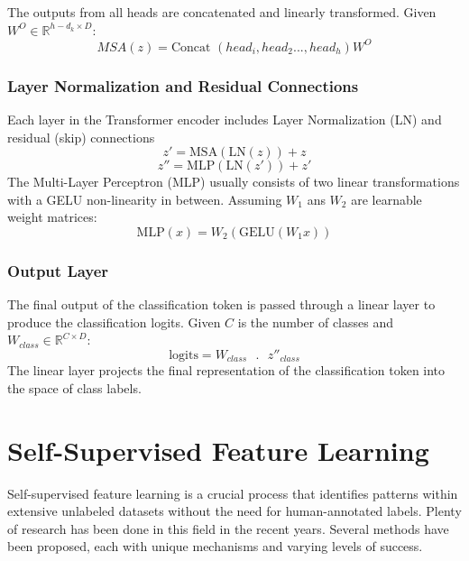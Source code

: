 The outputs from all heads are concatenated and linearly transformed. Given \(W^O \in \mathbb{R}^{h-d_k \times D } \):
\begin{equation}
	MSA(z) = \text{Concat  }(head_i, head_2..., head_h)W^O
\end{equation}

\subsubsection{Layer Normalization and Residual Connections}
Each layer in the Transformer encoder includes Layer Normalization (LN) and residual (skip) connections
\begin{equation}
	z' = \text{MSA}(\text{LN}(z)) + z
\end{equation}
\begin{equation}
	z'' = \text{MLP}(\text{LN}(z')) + z'
\end{equation}
The Multi-Layer Perceptron (MLP) usually consists of two linear transformations with a GELU non-linearity in between. Assuming \(W_1\) ans \(W_2\) are learnable weight matrices:
\begin{equation}
	\text{MLP}(x) = W_2(\text{GELU}(W_1x))
\end{equation}

\subsubsection{Output Layer}
The final output of the classification token is passed through a linear layer to produce the classification logits. Given \(C\) is the number of classes and \(W_{class} \in \mathbb{R}^{C \times D }\):
\begin{equation}
	\text{logits} = W_{class} \text{ }.\text{ } z''_{class}
\end{equation}
The linear layer projects the final representation of the classification token into the space of class labels.

\section{Self-Supervised Feature Learning}
Self-supervised feature learning is a crucial process that identifies patterns within extensive unlabeled datasets without the need for human-annotated labels. Plenty of research has been done in this field in the recent years. Several methods have been proposed, each with unique mechanisms and varying levels of success.

